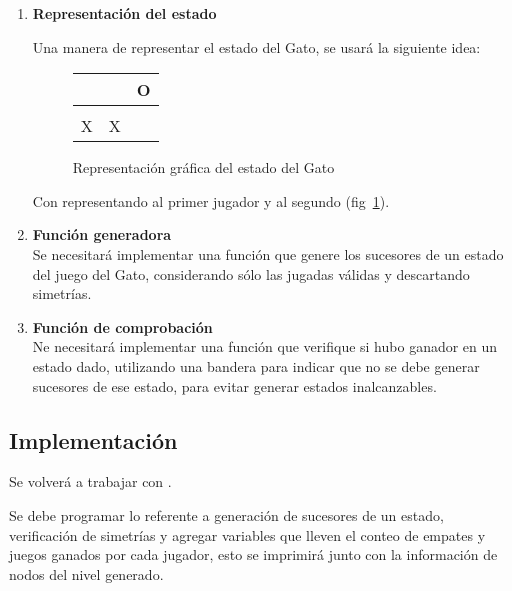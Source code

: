\begin{enumerate}
  \item \textbf{Representación del estado} \hfill\par
    Una manera de representar el estado del Gato, se usará la siguiente idea:\medskip
    

    \begin{figure}[h!]
      \begin{center}
        \begin{tabular}{ l | l | l }
             &   & O \\ \hline
             &   &   \\ \hline
           X & X &   \\
        \end{tabular}
      \end{center}
      \caption{Representación gráfica del estado del Gato}
      \label{fig:representacionestado}
    \end{figure}

    Con  representando al primer jugador y  al segundo (fig~\ref{fig:representacionestado}).


  \item \textbf{Función generadora}\hfill \\
    Se necesitará implementar una función que genere los sucesores de un estado del juego del Gato, considerando sólo las jugadas válidas y descartando simetrías.

  \item \textbf{Función de comprobación} \hfill \\
    Ne necesitará implementar una función que verifique si hubo ganador en un estado dado, utilizando una bandera para indicar que no se debe generar sucesores de ese estado, para evitar generar estados inalcanzables.
\end{enumerate}


\subsection{Implementaci\'on}
Se volverá a trabajar con .

Se debe programar lo referente a generación de sucesores de un estado, verificación de simetrías y agregar variables que lleven el conteo de empates y juegos ganados por cada jugador, esto se imprimirá junto con la información de nodos del nivel generado.


